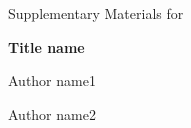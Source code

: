 \begin{titlepage}

\begin{center}

\Huge Supplementary Materials for

\bfseries Title name

\bigskip
\bigskip

\Large 
Author name1

Author name2

\end{center}

\end{titlepage}
